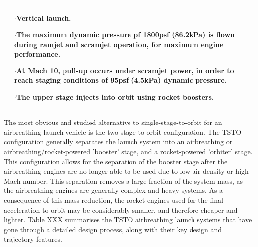 {\begin{landscape}
\begin{xltabular}{\linewidth}{|X|X|X|}
	&\small
	
	$\cdot$Vertical launch.
	
	$\cdot$The maximum dynamic pressure pf 1800psf (86.2kPa) is flown during ramjet and scramjet operation, for maximum engine performance. 
	
	$\cdot$At Mach 10, pull-up occurs under scramjet power, in order to reach staging conditions of 95psf (4.5kPa) dynamic pressure. 
	
	$\cdot$The upper stage injects into orbit using rocket boosters. 
	
	
	\\
\hline 
\end{xltabular} 
\end{landscape}
}

The most obvious and studied alternative to single-stage-to-orbit for an airbreathing launch vehicle is the two-stage-to-orbit configuration. The TSTO configuration generally separates the launch system into an airbreathing or airbreathing/rocket-powered 'booster' stage, and a rocket-powered 'orbiter' stage. This configuration allows for the separation of the booster stage after the airbreathing engines are no longer able to be used due to low air density or high Mach number. This separation removes a large fraction of the system mass, as the airbreathing engines are generally complex and heavy systems. As a consequence of this mass reduction, the rocket engines used for the final acceleration to orbit may be considerably smaller, and therefore cheaper and lighter. Table XXX summarises the TSTO airbreathing launch systems that have gone through a detailed design process, along with their key design and trajectory features. 



